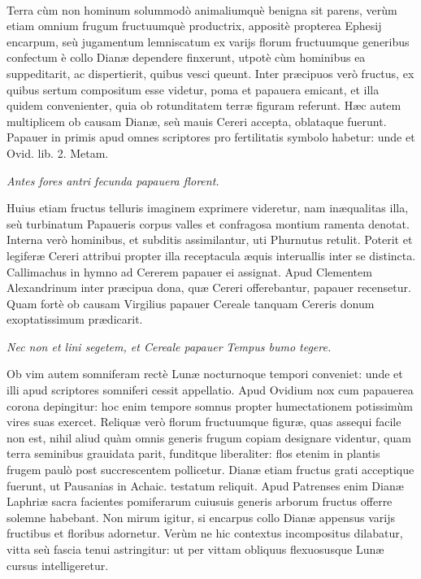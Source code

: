 \documentclass[a4paper, 11pt, oneside, polutonikogreek, latin]{article}
\begin{document}
\paragraph{}
Terra cùm non hominum solummodò animaliumquè benigna sit parens, verùm etiam omnium frugum fructuumquè productrix, appositè propterea Ephesij encarpum, seù jugamentum lemniscatum ex varijs florum fructuumque generibus confectum è collo Dianæ dependere finxerunt, utpotè cùm hominibus ea suppeditarit, ac dispertierit, quibus vesci queunt. Inter præcipuos verò fructus, ex quibus sertum compositum esse videtur, poma et papauera emicant, et illa quidem convenienter, quia ob rotunditatem terræ figuram referunt. Hæc autem multiplicem ob causam Dianæ, seù mauis Cereri accepta, oblataque fuerunt. Papauer in primis apud omnes scriptores pro fertilitatis symbolo habetur: unde et Ovid. lib. 2. Metam.

\emph{Antes fores antri fecunda papauera florent.}

Huius etiam fructus telluris imaginem exprimere videretur, nam inæqualitas illa, seù turbinatum Papaueris corpus valles et confragosa montium ramenta denotat. Interna verò hominibus, et subditis assimilantur, uti Phurnutus retulit. Poterit et legiferæ Cereri attribui propter illa receptacula æquis interuallis inter se distincta. Callimachus in hymno ad Cererem papauer ei assignat. Apud Clementem Alexandrinum inter præcipua dona, quæ Cereri offerebantur, papauer recensetur. Quam fortè ob causam Virgilius papauer Cereale tanquam Cereris donum exoptatissimum prædicarit.

\emph{Nec non et lini segetem, et Cereale papauer}
\emph{Tempus bumo tegere.}

Ob vim autem somniferam rectè Lunæ nocturnoque tempori conveniet: unde et illi apud scriptores somniferi cessit appellatio. Apud Ovidium nox cum papauerea corona depingitur: hoc enim tempore somnus propter humectationem potissimùm vires suas exercet. Reliquæ verò florum fructuumque figuræ, quas assequi facile non est, nihil aliud quàm omnis generis frugum copiam designare videntur, quam terra seminibus grauidata parit, funditque liberaliter: flos etenim in plantis frugem paulò post succrescentem pollicetur. Dianæ etiam fructus grati acceptique fuerunt, ut Pausanias in Achaic. testatum reliquit. Apud Patrenses enim Dianæ Laphriæ sacra facientes pomiferarum cuiusuis generis arborum fructus offerre solemne habebant. Non mirum igitur, si encarpus collo Dianæ appensus varijs fructibus et floribus adornetur. Verùm ne hic contextus incompositus dilabatur, vitta seù fascia tenui astringitur: ut per vittam obliquus flexuosusque Lunæ cursus intelligeretur.
\clearpage
\end{document}
